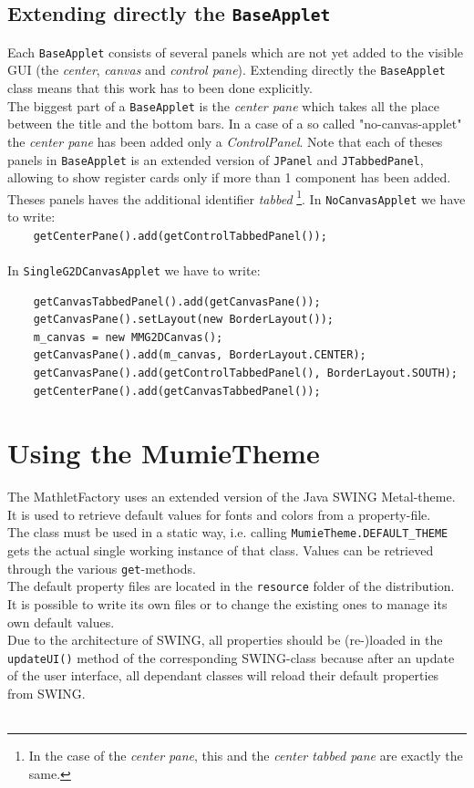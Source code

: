 \documentclass[a4paper,12pt]{book}
\begin{document}
  \subsection{Extending directly the {\tt BaseApplet}}
  Each {\tt BaseApplet} consists of several panels which are not yet added to the visible GUI (the
  {\it center}, {\it canvas} and {\it control pane}).
  Extending directly the {\tt BaseApplet} class means that this work has to been done explicitly.\\
  The biggest part of a {\tt BaseApplet} is the {\it center pane} which takes all the place between
  the title and the bottom bars. In a case of a so called "no-canvas-applet" the {\it center pane}
  has been added only a \emph{ControlPanel}. Note that each of theses panels in {\tt BaseApplet}
  is an extended version of \verb|JPanel| and \verb|JTabbedPanel|, allowing to show register cards
  only if more than 1 component has been added. Theses panels haves the additional identifier {\it tabbed}
  \footnote{In the case of the {\it center pane}, this and the {\it center tabbed pane} are exactly the same.}.
  In \verb|NoCanvasApplet| we have to write:\\
  \verb|    getCenterPane().add(getControlTabbedPanel());|\\\\
  In \verb|SingleG2DCanvasApplet| we have to write:
  \begin{footnotesize}
  \begin{verbatim}
    getCanvasTabbedPanel().add(getCanvasPane());
    getCanvasPane().setLayout(new BorderLayout());
    m_canvas = new MMG2DCanvas();
    getCanvasPane().add(m_canvas, BorderLayout.CENTER);
    getCanvasPane().add(getControlTabbedPanel(), BorderLayout.SOUTH);
    getCenterPane().add(getCanvasTabbedPanel());
  \end{verbatim}
  \end{footnotesize}
  
  \clearpage
  
\section{Using the MumieTheme}
  The MathletFactory uses an extended version of the Java SWING Metal-theme. It is used to
  retrieve default values for fonts and colors from a property-file.\\
  The class must be used in a static way, i.e. calling \verb|MumieTheme.DEFAULT_THEME| gets
  the actual single working instance of that class. Values can be retrieved through the various
  \verb|get|-methods.\\
  The default property files are located in the \verb|resource| folder of the distribution.
  It is possible to write its own files or to change the existing ones to manage its own
  default values.\\
  Due to the architecture of SWING, all properties should be (re-)loaded in the \verb|updateUI()| method
  of the corresponding SWING-class because after an update of the user interface, all dependant
  classes will reload their default properties from SWING.\\\\
  
\end{document}
